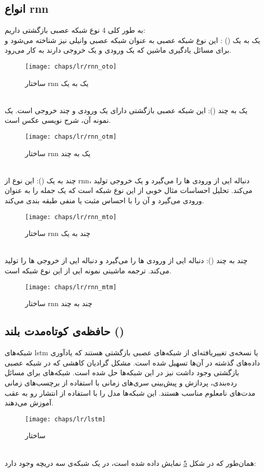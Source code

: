 \subsection{انواع \gls{rnn}}
\noindent
 به طور کلی 4 نوع شبکه عصبی بازگشتی داریم:\\
 یک به یک () : این نوع شبکه عصبی به عنوان شبکه عصبی وانیلی نیز شناخته می‌شود و برای مسائل یادگیری ماشین که یک ورودی و یک خروجی دارند به کار می‌رود.
 \begin{figure}[!ht]
 	\centerline{\texttt{[image: chaps/lr/rnn\_oto]}}
 	\caption{ساختار \gls{rnn} یک به یک}
 	\label{fig:ch_lr:rnn_oto}
 \end{figure}
\\
 یک به چند (): این شبکه عصبی بازگشتی دارای یک ورودی و چند خروجی است. یک نمونه آن، شرح نویسی عکس است.
 \begin{figure}[!ht]
 	\centerline{\texttt{[image: chaps/lr/rnn\_otm]}}
 	\caption{ساختار \gls{rnn} یک به چند}
 	\label{fig:ch_lr:rnn_otm}
 \end{figure}
\\
 چند به یک (): این نوع از \gls{rnn}، دنباله ایی از ورودی ها را می‌گیرد و یک خروجی تولید می‌کند. تحلیل احساسات مثال خوبی از این نوع شبکه است که یک جمله را به عنوان ورودی می‌گیرد و آن را با احساس مثبت یا منفی طبقه بندی می‌کند.
 \begin{figure}[!ht]
 	\centerline{\texttt{[image: chaps/lr/rnn\_mto]}}
 	\caption{ساختار \gls{rnn} چند به یک}
 	\label{fig:ch_lr:rnn_mto}
 \end{figure}
 \\
 چند به چند (): دنباله ایی از ورودی ها را می‌گیرد و دنباله ایی از خروجی ها را تولید می‌کند. ترجمه ماشینی نمونه ایی از این نوع شبکه است.
\begin{figure}[!ht]
	\centerline{\texttt{[image: chaps/lr/rnn\_mtm]}}
	\caption{ساختار \gls{rnn} چند به چند}
	\label{fig:ch_lr:rnn_mtm}
\end{figure} 
 \subsection{حافظه‌ی کوتاه‌مدت بلند ()}
 شبکه‌های \gls{lstm} یا  نسخه‌ی تغییریافته‌ای از شبکه‌های عصبی بازگشتی هستند که یادآوری داده‌های گذشته در آن‌ها تسهیل شده است. مشکل گرادیان کاهشی که در شبکه عصبی بازگشتی وجود داشت نیز در این شبکه‌ها حل شده است. شبکه‌های  برای مسائل رده‌بندی، پردازش و پیش‌بینی سری‌های زمانی با استفاده از برچسب‌های زمانی مدت‌های نامعلوم مناسب هستند. این شبکه‌ها مدل را با استفاده از انتشار رو به عقب آموزش می‌دهند. 
 \begin{figure}[!ht]
 	\centerline{\texttt{[image: chaps/lr/lstm]}}
 	\caption{ساختار }
 	\label{fig:ch_lr:lstm}
 \end{figure}
\\
همان‌طور که در شکل \ref{fig:ch_lr:lstm} نمایش داده شده است، در یک شبکه‌ی  سه دریچه وجود دارد:
 
